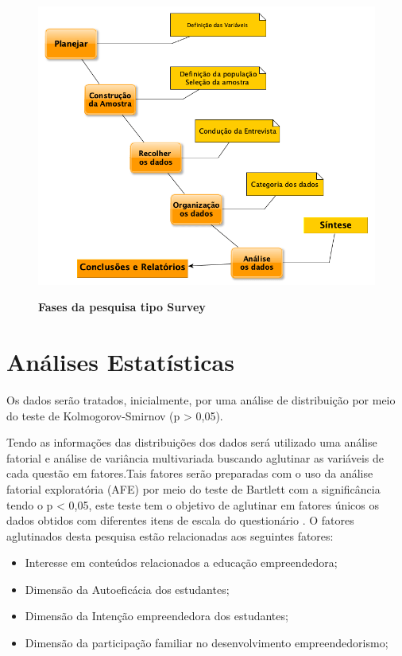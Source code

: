 \begin{figure}[!htb]
\centering
\caption{\textbf{Fases da pesquisa tipo Survey}}
\includegraphics[scale=0.3]{Imagens/diagrama_survey.png}
\label{figura_1}
\end{figure}

\clearpage


\section{Análises Estatísticas}


Os dados serão tratados, inicialmente, por uma análise de distribuição por meio do teste de
Kolmogorov-Smirnov (p > 0,05). 

Tendo as informações das distribuições dos dados será utilizado uma análise fatorial e análise de variância multivariada buscando aglutinar as variáveis de cada questão em fatores.Tais fatores serão preparadas com o uso da análise fatorial exploratória (AFE) por meio do teste de Bartlett com a significância tendo o p < 0,05, este teste tem o objetivo de aglutinar em fatores únicos os dados obtidos com diferentes itens de escala do questionário \cite{hair_multivariate_2006}. O fatores aglutinados desta pesquisa estão relacionadas aos seguintes fatores:


\begin{itemize}
\item {Interesse em conteúdos relacionados a educação empreendedora;}
\item {Dimensão da Autoeficácia dos estudantes;}
\item {Dimensão da  Intenção empreendedora dos estudantes;}
\item {Dimensão da participação familiar no desenvolvimento empreendedorismo;}
\end{itemize}


